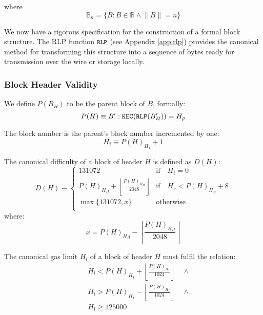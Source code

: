 \documentclass[9pt,oneside]{amsart}
\begin{document}
\begin{multicols}{2}
where
\begin{equation}
\mathbb{B}_n = \{ B: B \in \mathbb{B} \wedge \lVert B \rVert = n \}
\end{equation}

We now have a rigorous specification for the construction of a formal block structure. The RLP function $\texttt{\small RLP}$ (see Appendix \ref{app:rlp}) provides the canonical method for transforming this structure into a sequence of bytes ready for transmission over the wire or storage locally.

\subsubsection{Block Header Validity}

We define $P(B_H)$ to be the parent block of $B$, formally:
\begin{equation}
P(H) \equiv B': \mathtt{\tiny KEC}(\mathtt{\tiny RLP}(B'_H)) = H_p
\end{equation}

The block number is the parent's block number incremented by one:
\begin{equation}
H_i \equiv {{P(H)_H}_i} + 1
\end{equation}

The canonical difficulty of a block of header $H$ is defined as $D(H)$:
\begin{equation}
D(H) \equiv \begin{cases}
131072 & \text{if} \quad H_i = 0\\
{P(H)_H}_d + \left\lfloor\frac{{P(H)_H}_d}{2048}\right\rfloor & \text{if} \quad H_s < {P(H)_H}_s + 8\\
\max \{ 131072, x \} & \text{otherwise}\\
\end{cases}
\end{equation}
where:
\begin{equation}
x = {P(H)_H}_d - \left\lfloor\frac{{P(H)_H}_d}{2048}\right\rfloor
\end{equation}

The canonical gas limit $H_l$ of a block of header $H$ must fulfil the relation:
\begin{eqnarray}
& & H_l < {P(H)_H}_l + \left\lfloor\frac{{P(H)_H}_l}{1024}\right\rfloor \quad \wedge \\
& & H_l > {P(H)_H}_l - \left\lfloor\frac{{P(H)_H}_l}{1024}\right\rfloor \quad \wedge \\
& & H_l \geqslant 125000
\end{eqnarray}


\end{multicols}
\end{document}
